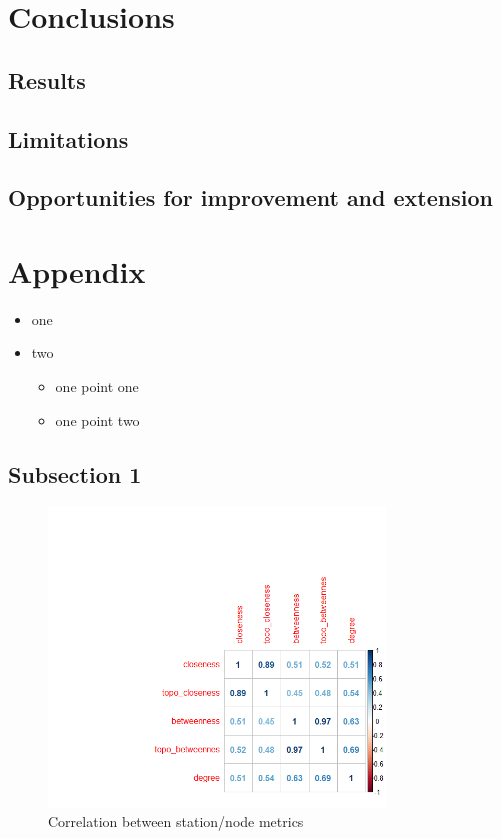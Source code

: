 \documentclass[11pt]{article} %
\begin{document}
\section{Conclusions}

\subsection{Results}

\subsection{Limitations}

\subsection{Opportunities for improvement and extension}




\section{Appendix}




\begin{itemize}
\item one
\item two
  \begin{itemize}
  \item one point one
  \item one point two
  \end{itemize}
\end{itemize}

\subsection{Subsection 1}

\begin{figure}
\centering
\includegraphics[width=0.8\textwidth]{example}
\caption{Correlation between station/node metrics}
\end{figure}
\end{document}
